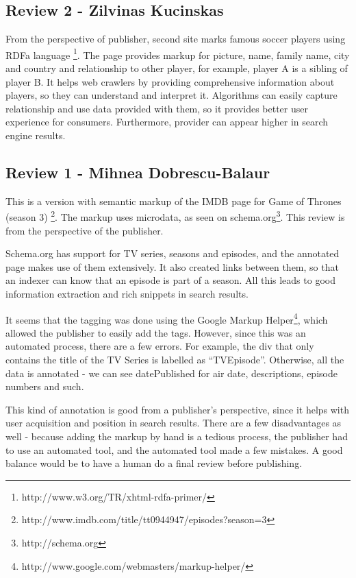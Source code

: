 \documentclass{acm_proc_10ptArticle-sp}
\begin{document}
\subsection{Review 2 - Zilvinas Kucinskas}
From the perspective of publisher, second site marks famous soccer players using RDFa language \footnote{http://www.w3.org/TR/xhtml-rdfa-primer/}. The page provides markup for picture, name, family name, city and country and relationship to other player, for example, player A is a sibling of player B. It helps web crawlers by providing comprehensive information about players, so they can understand and interpret it. Algorithms can easily capture relationship and use data provided with them, so it provides better user experience for consumers. Furthermore, provider can appear higher in search engine results.

\subsection{Review 1 - Mihnea Dobrescu-Balaur}

This is a version with semantic markup of the IMDB page for Game of Thrones (season 3) \footnote{http://www.imdb.com/title/tt0944947/episodes?season=3}. The markup uses microdata, as seen on schema.org\footnote{http://schema.org}. This review is from the perspective of the publisher.

Schema.org has support for TV series, seasons and episodes, and the annotated page makes use of them extensively. It also created links between them, so that an indexer can know that an episode is part of a season. All this leads to good information extraction and rich snippets in search results.

It seems that the tagging was done using the Google Markup Helper\footnote{http://www.google.com/webmasters/markup-helper/}, which allowed the publisher to easily add the tags. However, since this was an automated process, there are a few errors. For example, the div that only contains the title of the TV Series is labelled as “TVEpisode”. Otherwise, all the data is annotated - we can see datePublished for air date, descriptions, episode numbers and such.

This kind of annotation is good from a publisher’s perspective, since it helps with user acquisition and position in search results. There are a few disadvantages as well - because adding the markup by hand is a tedious process, the publisher had to use an automated tool, and the automated tool made a few mistakes. A good balance would be to have a human do a final review before publishing.
\end{document}
